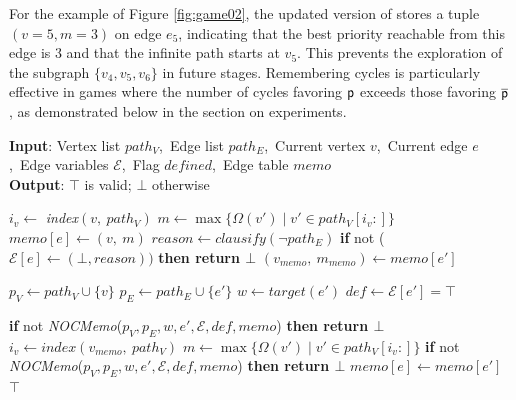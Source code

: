 \documentclass[a4paper,fleqn]{cas-sc}
\begin{document}
For the example of Figure \ref{fig:game02}, the updated version of \noc stores a tuple $(v=5, m=3)$ on edge $e_5$, indicating that the best priority reachable from this edge is 3 and that the infinite path starts at $v_5$. This prevents the exploration of the subgraph $\{v_4, v_5, v_6\}$ in future stages.
%
Remembering cycles is particularly effective in games where the number of cycles favoring $\mathsf{p}$ exceeds those favoring $\overline{\mathsf{p}}$, as demonstrated below in the section on experiments.

\begin{algorithm}[htb]
\caption{\textbf{\textit{NOCMemo}}}
\small
\textbf{Input}: Vertex list $path_V$,\ Edge list $path_E$,\ Current vertex $v$,\ Current edge $e$,\ Edge variables $\mathcal{E}$,\ Flag $\textit{defined}$,\ Edge table $\textit{memo}$ \\
\textbf{Output}: $\top$ is valid; $\bot$ otherwise
\begin{algorithmic}[1]
        \STATE $i_v \gets$ \textit{index}$(v,\ path_V)$
        \STATE $m \gets \max\{\Omega(v') \mid v' \in path_V[i_v:]\}$
        \STATE $\textit{memo}[e] \gets (v,\ m)$ \label{alg:noc-memo:update}
            \STATE $\textit{reason} \gets \textit{clausify}(\neg path_E)$
            \STATE \textbf{if }not ($\mathcal{E}[e] \gets (\bot, \textit{reason}))$ \textbf{then return $\bot$}
        \ENDIF
            \STATE $(v_{memo},\ m_{memo}) \gets \textit{memo}[e']$

            \STATE $p_V \gets path_V \cup \{v\}$
            \STATE $p_E \gets path_E \cup \{e'\}$
            \STATE $w \gets \textit{target}(e')$
            \STATE $\textit{def} \gets \mathcal{E}[e'] = \top$

                \STATE \textbf{if }not \textit{NOCMemo}($p_V, p_E, w, e', \mathcal{E}, def , \textit{memo}$) \textbf{then return $\bot$} \label{alg:noc-memo:check1}
            \ELSE
                \STATE $i_v \gets \textit{index}(v_{memo},\ path_V)$
                \STATE $m \gets \max\{\Omega(v') \mid v' \in path_V[i_v:]\}$
                    \STATE \textbf{if }not \textit{NOCMemo}($p_V, p_E, w, e', \mathcal{E}, def , \textit{memo}$) \textbf{then return $\bot$} \label{alg:noc-memo:check2}
                \ELSE
                    \STATE $\textit{memo}[e] \gets \textit{memo}[e']$ \label{alg:noc-memo:reuse}
                \ENDIF
            \ENDIF
        \ENDFOR
    \ENDIF
    \RETURN $\top$
\end{algorithmic}
\label{alg:noc-memo}
\end{algorithm}
\end{document}
